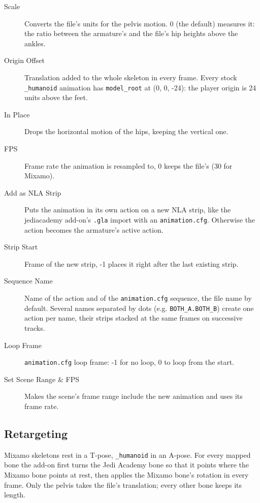 \documentclass[a4paper,10pt]{article}
\begin{document}
 \begin{description}
  \item[Scale] Converts the file's units for the pelvis motion. 0 (the default) measures it: the
        ratio between the armature's and the file's hip heights above the ankles.
  \item[Origin Offset] Translation added to the whole skeleton in every frame. Every stock
        \texttt{\_humanoid} animation has \texttt{model\_root} at (0, 0, -24): the player origin is
        24 units above the feet.
  \item[In Place] Drops the horizontal motion of the hips, keeping the vertical one.
  \item[FPS] Frame rate the animation is resampled to, 0 keeps the file's (30 for Mixamo).
  \item[Add as NLA Strip] Puts the animation in its own action on a new NLA strip, like the
        jediacademy add-on's \texttt{.gla} import with an \texttt{animation.cfg}. Otherwise the
        action becomes the armature's active action.
  \item[Strip Start] Frame of the new strip, -1 places it right after the last existing strip.
  \item[Sequence Name] Name of the action and of the \texttt{animation.cfg} sequence, the file name
        by default. Several names separated by dots (e.g. \texttt{BOTH\_A.BOTH\_B}) create one action
        per name, their strips stacked at the same frames on successive tracks.
  \item[Loop Frame] \texttt{animation.cfg} loop frame: -1 for no loop, 0 to loop from the start.
  \item[Set Scene Range \& FPS] Makes the scene's frame range include the new animation and uses
        its frame rate.
 \end{description}

 \subsection{Retargeting}

 Mixamo skeletons rest in a T-pose, \texttt{\_humanoid} in an A-pose. For every mapped bone the
 add-on first turns the Jedi Academy bone so that it points where the Mixamo bone points at rest,
 then applies the Mixamo bone's rotation in every frame. Only the pelvis takes the file's
 translation; every other bone keeps its length.
\end{document}
